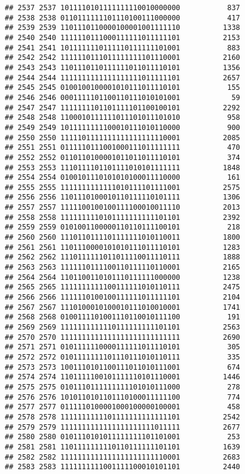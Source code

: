 \documentclass[]{article}
\begin{document}
\begin{verbatim}
## 2537 2537 1011110101111111110010000000           837
## 2538 2538 0110111111101110100111000000           417
## 2539 2539 1101110110000100001001111110          1338
## 2540 2540 1111110111000111111011111101          2153
## 2541 2541 1011111110111110111111101001           883
## 2542 2542 1111110111011111111101110001          2160
## 2543 2543 1101110110111111011011110101          1356
## 2544 2544 1111111111111111111011111101          2657
## 2545 2545 0100100100001010111011110101           155
## 2546 2546 0001111101100110111010101001            59
## 2547 2547 1111111101101111101100100101          2292
## 2548 2548 1100010111111011101011101010           958
## 2549 2549 1011111111100010111010110000           900
## 2550 2550 1111101111111111111111110001          2085
## 2551 2551 0111110111001000111011111111           470
## 2552 2552 0110110100001011011011110101           374
## 2553 2553 1110111101101111010101111111          1848
## 2554 2554 0100101110101010100011110000           161
## 2555 2555 1111111111111010111101111001          2575
## 2556 2556 1101110100010110111110101111          1306
## 2557 2557 1111100100100111100010011110          2013
## 2558 2558 1111111110101111111111101101          2392
## 2559 2559 0101001100000110110111100101           218
## 2560 2560 1110110111101111111010110011          1800
## 2561 2561 1101110000101010111011110101          1283
## 2562 2562 1110111111011011110011110111          1888
## 2563 2563 1111110111100110111110110001          2165
## 2564 2564 1101100110101110111111000000          1238
## 2565 2565 1111111111100111111010110111          2475
## 2566 2566 1111110100100111111011111101          2104
## 2567 2567 1110100010100010111010010001          1741
## 2568 2568 0100111101001110110010111100           191
## 2569 2569 1111111111110111111111101101          2563
## 2570 2570 1111111111111111111111111111          2690
## 2571 2571 0101111110000111111011110101           305
## 2572 2572 0101111111101110111010110111           335
## 2573 2573 1001110101100111011010111001           674
## 2574 2574 1101111100101111110101110001          1446
## 2575 2575 0101110111111111101010111000           278
## 2576 2576 1010110101101110100011111100           774
## 2577 2577 0111110100001000100000100001           458
## 2578 2578 1111111111101111111111111101          2542
## 2579 2579 1111111111111111111111011111          2677
## 2580 2580 0101110101011111111101101001           253
## 2581 2581 1101111111110110111111101101          1639
## 2582 2582 1111111111111111111111110001          2683
## 2583 2583 1111111111001111100010101101          2440

\end{verbatim}
\end{document}
